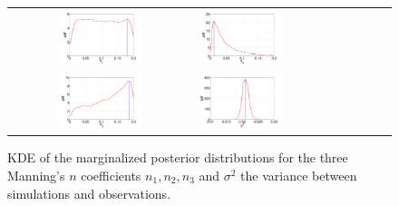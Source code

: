  \begin{figure}[ht]
        \begin{tabular}{clc}
\includegraphics[width=0.475\textwidth]{./figures/pdf_p1.pdf} &
\includegraphics[width=0.475\textwidth]{./figures/pdf_p2.pdf} \\
\includegraphics[width=0.475\textwidth]{./figures/pdf_p3.pdf} &
\includegraphics[width=0.475\textwidth]{./figures/pdf_s1.pdf}
        \end{tabular}
        \caption{KDE of the marginalized posterior distributions for the three Manning's $n$ coefficients $n_1,n_2,n_3$ 
and $\sigma^2$ the variance between simulations and observations.}
\label{fig:pdfs} 
        \end{figure}
